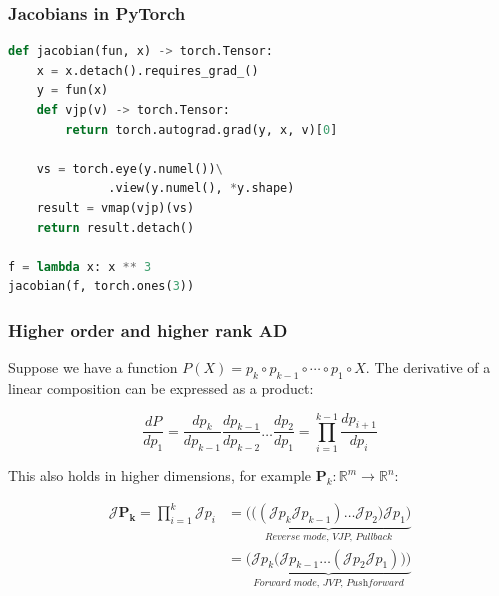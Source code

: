 \documentclass{beamer}
\begin{document}
    \begin{frame}[fragile]
        \frametitle{Jacobians in PyTorch}
        \begin{lstlisting}[language=Python]
def jacobian(fun, x) -> torch.Tensor:
    x = x.detach().requires_grad_()
    y = fun(x)
    def vjp(v) -> torch.Tensor:
        return torch.autograd.grad(y, x, v)[0]

    vs = torch.eye(y.numel())\
              .view(y.numel(), *y.shape)
    result = vmap(vjp)(vs)
    return result.detach()

f = lambda x: x ** 3
jacobian(f, torch.ones(3))
        \end{lstlisting}
    \end{frame}

    \begin{frame}
        \frametitle{Higher order and higher rank AD}

        Suppose we have a function $P(X) = p_k \circ p_{k-1} \circ \cdots \circ p_1 \circ X$. The derivative of a linear composition can be expressed as a product:

        \begin{equation*} \label{eq:sfun_chain_rule}
        \frac{dP}{dp_1} = \frac{dp_k}{dp_{k-1}}\frac{dp_{k-1}}{dp_{k-2}}\dots\frac{dp_2}{dp_1}= {\displaystyle \prod_{i=1}^{k-1} \frac{dp_{i+1}}{dp_{i}}}
        \end{equation*}

        This also holds in higher dimensions, for example $\mathbf{P}_k: \mathbb{R}^m\rightarrow\mathbb{R}^n$:

        \begin{align*} \label{eq:vfun_chain_rule}
        \mathcal{J} \mathbf{P_k} = \displaystyle \prod_{i=1}^{k} \mathcal{J}p_i &= \underbrace{\bigg(\Big((\mathcal{J}p_k \mathcal{J}p_{k-1}) \dots \mathcal{J}p_2\Big) \mathcal{J}p_1\bigg)}_{\textit{Reverse mode, VJP, Pullback}} \\
        &= \underbrace{\bigg(\mathcal{J}p_k \Big(\mathcal{J}p_{k-1} \dots (\mathcal{J}p_2 \mathcal{J}p_1)\Big)\bigg)}_{\textit{Forward mode, JVP, Pushforward}}
        \end{align*}
    \end{frame}
\end{document}
